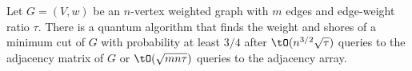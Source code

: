 \begin{theorem}
\label{thm:main}
Let $G =(V,w)$ be an $n$-vertex weighted graph with $m$ edges and edge-weight ratio $\tau$.  There is a quantum algorithm that finds the 
weight and shores of a minimum cut of $G$ with probability at least $3/4$ after 
$\tO(n^{3/2}\sqrt{\tau})$ queries to the adjacency matrix of $G$ or $\tO(\sqrt{mn\tau})$ queries to the adjacency array.
\end{theorem}
